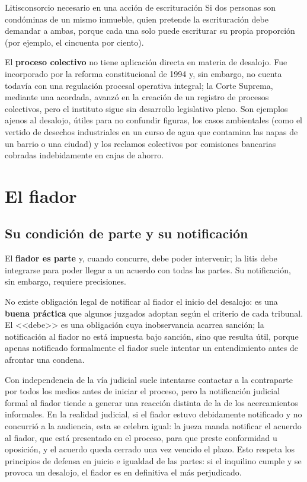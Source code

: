 \documentclass[12pt,oneside]{book}
\begin{document}
\begin{example}{Litisconsorcio necesario en una acción de escrituración}
Si dos personas son condóminas de un mismo inmueble, quien pretende la escrituración debe demandar a ambas, porque cada una solo puede escriturar su propia proporción (por ejemplo, el cincuenta por ciento).
\end{example}

El \textbf{proceso colectivo} no tiene aplicación directa en materia de desalojo. Fue incorporado por la reforma constitucional de 1994 y, sin embargo, no cuenta todavía con una regulación procesal operativa integral; la Corte Suprema, mediante una acordada, avanzó en la creación de un registro de procesos colectivos, pero el instituto sigue sin desarrollo legislativo pleno. Son ejemplos ajenos al desalojo, útiles para no confundir figuras, los casos ambientales (como el vertido de desechos industriales en un curso de agua que contamina las napas de un barrio o una ciudad) y los reclamos colectivos por comisiones bancarias cobradas indebidamente en cajas de ahorro.

\section{El fiador}\label{sec:fiador}

\subsection{Su condición de parte y su notificación}

El \textbf{fiador es parte} y, cuando concurre, debe poder intervenir; la litis debe integrarse para poder llegar a un acuerdo con todas las partes. Su notificación, sin embargo, requiere precisiones.

\begin{important}
No existe obligación legal de notificar al fiador el inicio del desalojo: es una \textbf{buena práctica} que algunos juzgados adoptan según el criterio de cada tribunal. El <<debe>> es una obligación cuya inobservancia acarrea sanción; la notificación al fiador no está impuesta bajo sanción, sino que resulta útil, porque apenas notificado formalmente el fiador suele intentar un entendimiento antes de afrontar una condena.
\end{important}

Con independencia de la vía judicial suele intentarse contactar a la contraparte por todos los medios antes de iniciar el proceso, pero la notificación judicial formal al fiador tiende a generar una reacción distinta de la de los acercamientos informales. En la realidad judicial, si el fiador estuvo debidamente notificado y no concurrió a la audiencia, esta se celebra igual: la jueza manda notificar el acuerdo al fiador, que está presentado en el proceso, para que preste conformidad u oposición, y el acuerdo queda cerrado una vez vencido el plazo. Esto respeta los principios de defensa en juicio e igualdad de las partes: si el inquilino cumple y se provoca un desalojo, el fiador es en definitiva el más perjudicado.
\end{document}
